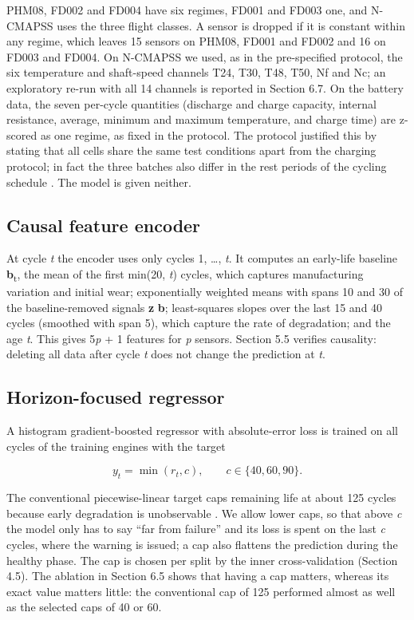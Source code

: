 \documentclass[a4paper,fleqn,doubleblind]{cas-dc}
\begin{document}
PHM08, FD002 and FD004 have six regimes, FD001 and FD003 one, and N-CMAPSS uses the three flight classes. A sensor is dropped if it is constant within any regime, which leaves 15 sensors on PHM08, FD001 and FD002 and 16 on FD003 and FD004. On N-CMAPSS we used, as in the pre-specified protocol, the six temperature and shaft-speed channels T24, T30, T48, T50, Nf and Nc; an exploratory re-run with all 14 channels is reported in Section 6.7. On the battery data, the seven per-cycle quantities (discharge and charge capacity, internal resistance, average, minimum and maximum temperature, and charge time) are z-scored as one regime, as fixed in the protocol. The protocol justified this by stating that all cells share the same test conditions apart from the charging protocol; in fact the three batches also differ in the rest periods of the cycling schedule \cite{severson2019}. The model is given neither.

\subsection{Causal feature encoder}

At cycle \textit{t} the encoder uses only cycles 1, \ldots{}, \textit{t}. It computes an early-life baseline \textbf{b}\textsubscript{t}, the mean of the first min(20, \textit{t}) cycles, which captures manufacturing variation and initial wear; exponentially weighted means with spans 10 and 30 of the baseline-removed signals \textbf{z} \textminus{} \textbf{b}; least-squares slopes over the last 15 and 40 cycles (smoothed with span 5), which capture the rate of degradation; and the age \textit{t}. This gives 5\textit{p} + 1 features for \textit{p} sensors. Section 5.5 verifies causality: deleting all data after cycle \textit{t} does not change the prediction at \textit{t}.

\subsection{Horizon-focused regressor}

A histogram gradient-boosted regressor \cite{pedregosa2011} with absolute-error loss is trained on all cycles of the training engines with the target

\begin{equation}
y_t = \min( r_t, c ), \qquad c \in \{40, 60, 90\}.
\end{equation}

The conventional piecewise-linear target caps remaining life at about 125 cycles because early degradation is unobservable \cite{heimes2008}. We allow lower caps, so that above \textit{c} the model only has to say ``far from failure'' and its loss is spent on the last \textit{c} cycles, where the warning is issued; a cap also flattens the prediction during the healthy phase. The cap is chosen per split by the inner cross-validation (Section 4.5). The ablation in Section 6.5 shows that having a cap matters, whereas its exact value matters little: the conventional cap of 125 performed almost as well as the selected caps of 40 or 60.
\end{document}
